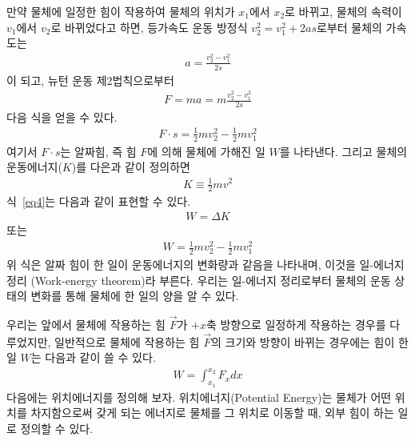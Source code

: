 \documentclass[12pt,a4paper]{article}
\begin{document}
만약 물체에 일정한 힘이 작용하여 물체의 위치가 $x_1$에서 $x_2$로 바뀌고, 물체의
속력이 $v_1$에서 $v_2$로 바뀌었다고 하면, 등가속도 운동 방정식
$v_2^2=v_1^2+2as$로부터 물체의 가속도는
\begin{equation}
    \begin{aligned}
        a=\frac{v_2^2-v_1^2}{2s}
        \label{eq2}
    \end{aligned}
\end{equation}
이 되고, 뉴턴 운동 제2법칙으로부터
\begin{equation}
    \begin{aligned}
        F=ma=m\frac{v_2^2-v_1^2}{2s}
        \label{eq3}
    \end{aligned}
\end{equation}
다음 식을 얻을 수 있다.
\begin{equation}
    \begin{aligned}
        F \cdot s = \frac{1}{2}mv_2^2-\frac{1}{2}mv_1^2
        \label{eq4}
    \end{aligned}
\end{equation}
여기서 $F \cdot s$는 알짜힘, 즉 힘 $F$에 의해 물체에 가해진 일 $W$를 나타낸다.
그리고 물체의 운동에너지($K$)를 다은과 같이 정의하면
\begin{equation}
    \begin{aligned}
        K \equiv \frac{1}{2}mv^2
        \label{eq5}
    \end{aligned}
\end{equation}
식~\ref{eq4}는 다음과 같이 표현할 수 있다.
\begin{equation}
    \begin{aligned}
        W = \Delta K
        \label{eq6}
    \end{aligned}
\end{equation}
또는
\begin{equation}
    \begin{aligned}
        W = \frac{1}{2}mv_2^2-\frac{1}{2}mv_1^2
        \label{eq7}
    \end{aligned}
\end{equation}
위 식은 알짜 힘이 한 일이 운동에너지의 변화량과 같음을 나타내며, 이것을 일-에너지 정리
(Work-energy theorem)라 부른다. 우리는 일-에너지 정리로부터 물체의 운동 상태의
변화를 통해 물체에 한 일의 양을 알 수 있다.

우리는 앞에서 물체에 작용하는 힘 $\vec{F}$가 $+x$축 방향으로 일정하게 작용하는 경우를
다루었지만, 일반적으로 물체에 작용하는 힘 $\vec{F}$의 크기와 방향이 바뀌는 경우에는
힘이 한 일 $W$는 다음과 같이 쓸 수 있다.
\begin{equation}
    \begin{aligned}
        W = \int_{x_1}^{x_2}F_xdx
        \label{eq8}
    \end{aligned}
\end{equation}
다음에는 위치에너지를 정의해 보자. 위치에너지(Potential Energy)는 물체가 어떤 위치를
차지함으로써 갖게 되는 에너지로 물체를 그 위치로 이동할 때, 외부 힘이 하는 일로 정의할
수 있다.
\end{document}
